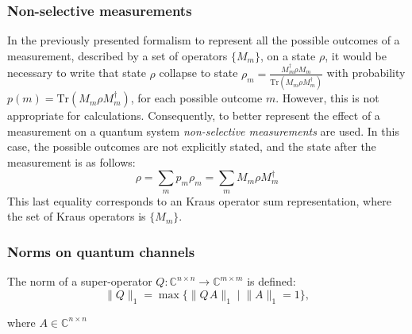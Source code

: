 \subsubsection{Non-selective measurements}

In the previously presented formalism to represent all the possible outcomes of a measurement, described by a set of operators $\{M_{m}\}$, on a state $\rho$, it would be necessary to write that state $\rho$ collapse to state $\rho_m=\frac{M_{m}^{\dag}\rho M_{m}}{\text{Tr}(M_{m}\rho M_{m}^{\dag})}$ with probability $p(m)=\text{Tr}(M_{m}\rho M_{m}^{\dag})$, for each possible outcome $m$. However, this is not appropriate for calculations. Consequently, to better represent the effect of a measurement on a quantum system \emph{non-selective measurements} are used. In this case, the possible outcomes are not explicitly stated, and the state after the measurement is as follows:
\begin{equation*}
  \rho = \sum_{m} p_m \rho_m = \sum_{m} M_m \rho M^{\dag}_m
\end{equation*}
This last equality corresponds to an Kraus operator sum representation, where the set of Kraus operators is $\{M_{m}\}$.






\subsubsection{Norms on quantum channels}
\begin{definition} \label{def:trace_norm_superoperator}
  The norm of a super-operator $Q: \mathbb{C}^{n\times n} \xrightarrow{} \mathbb{C}^{m\times m }$ is defined:
  \begin{equation} 
    \lVert Q \rVert_{1} =  \max\{\lVert Q \hspace{1pt} A \rVert_{1}   \mid  \lVert A \rVert_{1}=1\}, 
  \end{equation}
\end{definition}
where $A \in \mathbb{C}^{n \times n }$

